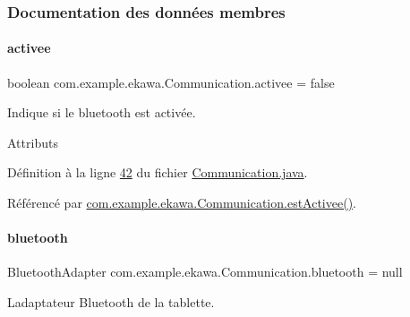 \subsubsection{Documentation des données membres}
\mbox{\label{classcom_1_1example_1_1ekawa_1_1_communication_a2f49177a9865ed41a759bce83658bb6e}} 
\paragraph{\texorpdfstring{activee}{activee}}
{\footnotesize\ttfamily boolean com.\+example.\+ekawa.\+Communication.\+activee = false\hspace{0.3cm}{\ttfamily [private]}}



Indique si le bluetooth est activée. 

Attributs 

Définition à la ligne \hyperlink{_communication_8java_source_l00042}{42} du fichier \hyperlink{_communication_8java_source}{Communication.\+java}.



Référencé par \hyperlink{_communication_8java_source_l00268}{com.\+example.\+ekawa.\+Communication.\+est\+Activee()}.

\mbox{\label{classcom_1_1example_1_1ekawa_1_1_communication_a0ed43f74b2eae7e8f150b049953da384}} 
\paragraph{\texorpdfstring{bluetooth}{bluetooth}}
{\footnotesize\ttfamily Bluetooth\+Adapter com.\+example.\+ekawa.\+Communication.\+bluetooth = null\hspace{0.3cm}{\ttfamily [private]}}



L\textquotesingle{}adaptateur Bluetooth de la tablette. 



